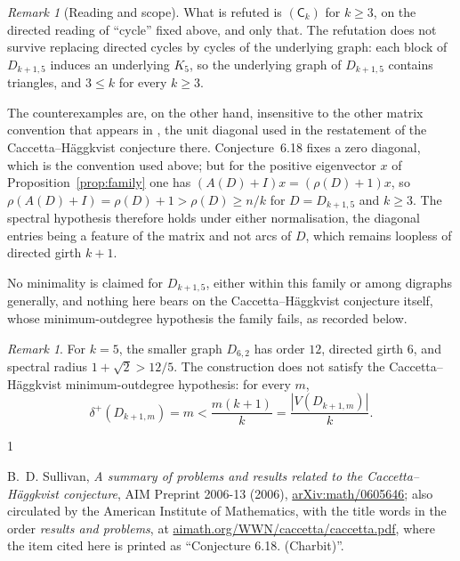 \documentclass[11pt]{amsart}
\theoremstyle{remark}
\newtheorem{remark}[theorem]{Remark}
\begin{document}
\begin{remark}[Reading and scope]\label{rem:reading}
What is refuted is $(\mathsf C_k)$ for $k\ge3$, on the directed reading of
``cycle'' fixed above, and only that. The refutation does not survive
replacing directed cycles by cycles of the underlying graph: each block of
$D_{k+1,5}$ induces an underlying $K_5$, so the underlying graph of
$D_{k+1,5}$ contains triangles, and $3\le k$ for every $k\ge3$.

The counterexamples are, on the other hand, insensitive to the other
matrix convention that appears in \cite{Sullivan}, the unit diagonal used
in the restatement of the Caccetta--H\"aggkvist conjecture there.
Conjecture~6.18 fixes a zero diagonal, which is the convention used above;
but for the positive eigenvector $x$ of Proposition~\ref{prop:family} one
has $(A(D)+I)x=(\rho(D)+1)x$, so
$\rho(A(D)+I)=\rho(D)+1>\rho(D)\ge n/k$ for $D=D_{k+1,5}$ and $k\ge3$.
The spectral hypothesis therefore holds under either normalisation, the
diagonal entries being a feature of the matrix and not arcs of $D$, which
remains loopless of directed girth $k+1$.

No minimality is claimed for $D_{k+1,5}$, either within this family or
among digraphs generally, and nothing here bears on the
Caccetta--H\"aggkvist conjecture \cite[Conjecture~2.1]{Sullivan} itself,
whose minimum-outdegree hypothesis the family fails, as recorded below.
\end{remark}

\begin{remark}
For $k=5$, the smaller graph $D_{6,2}$ has order $12$, directed girth $6$,
and spectral radius $1+\sqrt2>12/5$. The construction does not satisfy the
Caccetta--H\"aggkvist minimum-outdegree hypothesis: for every $m$,
\[
 \delta^+(D_{k+1,m})=m<\frac{m(k+1)}{k}
 =\frac{|V(D_{k+1,m})|}{k}.
\]
\end{remark}

\begin{thebibliography}{1}

B.~D. Sullivan,
\emph{A summary of problems and results related to the
Caccetta--H\"aggkvist conjecture},
AIM Preprint 2006-13 (2006),
\href{https://arxiv.org/abs/math/0605646}{arXiv:math/0605646};
also circulated by the American Institute of Mathematics, with the title
words in the order \emph{results and problems}, at
\href{https://aimath.org/WWN/caccetta/caccetta.pdf}
{aimath.org/WWN/caccetta/caccetta.pdf},
where the item cited here is printed as ``Conjecture 6.18. (Charbit)''.

\end{thebibliography}
\end{document}
